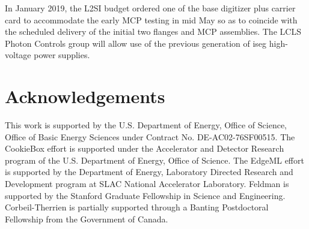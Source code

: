 \documentclass[aps]{revtex4}
\begin{document}
In January 2019, the L2SI budget ordered one of the base digitizer plus carrier card to accommodate the early MCP testing in mid May so as to coincide with the scheduled delivery of the initial two flanges and MCP assemblies.
The LCLS Photon Controls group will allow use of the previous generation of iseg high-voltage power supplies.






\section*{Acknowledgements}
This work is supported by the U.S. Department of Energy, Office of Science, Office of Basic Energy Sciences under Contract No. DE-AC02-76SF00515.
The CookieBox effort is supported under the Accelerator and Detector Research program of the U.S. Department of Energy, Office of Science.
The EdgeML effort is supported by the Department of Energy, Laboratory Directed Research and Development program at SLAC National Accelerator Laboratory.
Feldman is supported by the Stanford Graduate Fellowship in Science and Engineering.
Corbeil-Therrien is partially supported through a Banting Postdoctoral Fellowship from the Government of Canada.
\end{document}
